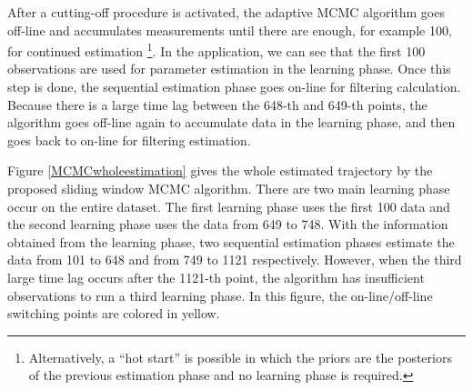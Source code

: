 

After a cutting-off procedure is activated, the adaptive MCMC algorithm goes off-line and accumulates measurements until there are enough, for example 100, for continued estimation \footnote{Alternatively, a ``hot start'' is possible in which the priors are the posteriors of the previous estimation phase and no learning phase is required.}. In the application, we can see that the first 100 observations are used for parameter estimation in the learning phase. Once this step is done, the sequential estimation phase goes on-line for filtering calculation. Because there is a large time lag between the 648-th and 649-th points, the algorithm goes off-line again to accumulate data in the learning phase, and then goes back to on-line for filtering estimation. 

Figure \ref{MCMCwholeestimation} gives the whole estimated trajectory by the proposed sliding window MCMC algorithm. There are two main learning phase occur on the entire dataset. The first learning phase uses the first 100 data and the second learning phase uses the data from 649 to 748. With the information obtained from the learning phase, two sequential estimation phases estimate the data from 101 to 648 and from 749 to 1121 respectively. However, when the third large time lag occurs after the 1121-th point, the algorithm has insufficient observations to run a third learning phase. In this figure, the on-line/off-line switching points are colored in yellow. 


